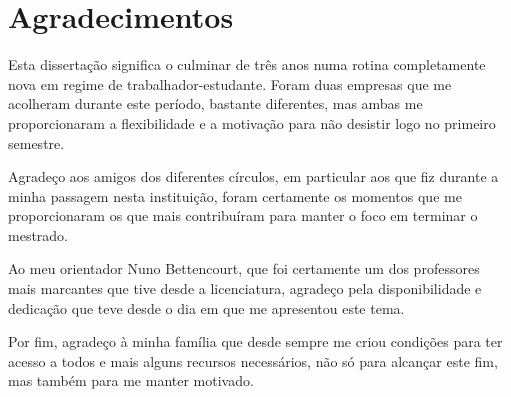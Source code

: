 \chapter*{Agradecimentos}

Esta dissertação significa o culminar de três anos numa rotina completamente nova em regime de trabalhador-estudante. Foram duas empresas que me acolheram durante este período, bastante diferentes, mas ambas me proporcionaram a flexibilidade e a motivação para não desistir logo no primeiro semestre.

Agradeço aos amigos dos diferentes círculos, em particular aos que fiz durante a minha passagem nesta instituição, foram certamente os momentos que me proporcionaram os que mais contribuíram para manter o foco em terminar o mestrado.

Ao meu orientador Nuno Bettencourt, que foi certamente um dos professores mais marcantes que tive desde a licenciatura, agradeço pela disponibilidade e dedicação que teve desde o dia em que me apresentou este tema.

Por fim, agradeço à minha família que desde sempre me criou condições para ter acesso a todos e mais alguns recursos necessários, não só para alcançar este fim, mas também para me manter motivado.

